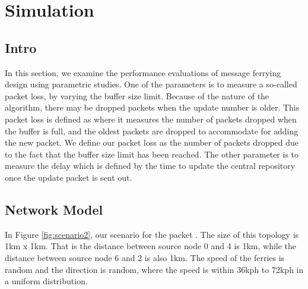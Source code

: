 \chapter{Simulation}

\section{Intro}

In this section, we examine the performance evaluations of message ferrying design using parametric studies.
One of the parameters is to measure a so-called packet loss, by varying the buffer size limit.
Because of the nature of the algorithm, there may be dropped packets when the update number is older.
This packet loss is defined as where it measures the number of packets dropped when the buffer is full, and the oldest packets are dropped to accommodate for adding the new packet.  
We define our packet loss as the number of packets dropped due to the fact that the buffer size limit has been reached.
The other parameter is to measure the delay which is defined by the time to update the central repository once the update packet is sent out.



\section{Network Model}

In Figure \ref{fig:scenario2}, our scenario for the packet .  
The size of this topology is 1km x 1km.  
That is the distance between source node 0 and 4 is 1km, while the distance between source node 6 and 2 is also 1km.  
The speed of the ferries is random and the direction is random, where the speed is within 36kph to 72kph in a uniform distribution.  

